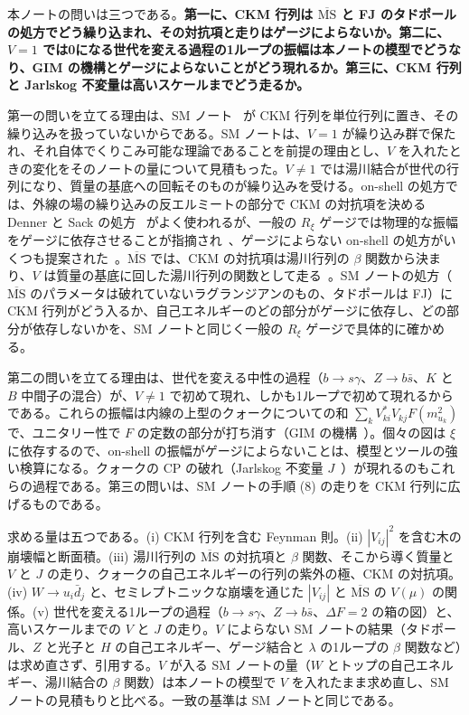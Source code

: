 \documentclass[a4paper,10pt]{ltjsarticle}
\newcommand{\MSbar}{\overline{\mathrm{MS}}}
\begin{document}
本ノートの問いは三つである。\textbf{第一に、CKM 行列は $\MSbar$ と FJ のタドポールの処方でどう繰り込まれ、その対抗項と走りはゲージによらないか。第二に、$V=1$ では0になる世代を変える過程の1ループの振幅は本ノートの模型でどうなり、GIM の機構とゲージによらないことがどう現れるか。第三に、CKM 行列と Jarlskog 不変量は高いスケールまでどう走るか。}

第一の問いを立てる理由は、SM ノート~\cite{smnote} が CKM 行列を単位行列に置き、その繰り込みを扱っていないからである。SM ノートは、$V=1$ が繰り込み群で保たれ、それ自体でくりこみ可能な理論であることを前提の理由とし、$V$ を入れたときの変化をそのノートの量について見積もった。$V\ne1$ では湯川結合が世代の行列になり、質量の基底への回転そのものが繰り込みを受ける。on-shell の処方では、外線の場の繰り込みの反エルミートの部分で CKM の対抗項を決める Denner と Sack の処方~\cite{ds90} がよく使われるが、一般の $R_\xi$ ゲージでは物理的な振幅をゲージに依存させることが指摘され~\cite{ggm99,yamada01}、ゲージによらない on-shell の処方がいくつも提案された~\cite{dkr04,ks06}。$\MSbar$ では、CKM の対抗項は湯川行列の $\beta$ 関数から決まり、$V$ は質量の基底に回した湯川行列の関数として走る~\cite{babu87,bhmp99}。SM ノートの処方（$\MSbar$ のパラメータは破れていないラグランジアンのもの、タドポールは FJ）に CKM 行列がどう入るか、自己エネルギーのどの部分がゲージに依存し、どの部分が依存しないかを、SM ノートと同じく一般の $R_\xi$ ゲージで具体的に確かめる。

第二の問いを立てる理由は、世代を変える中性の過程（$b\to s\gamma$、$Z\to b\bar s$、$K$ と $B$ 中間子の混合）が、$V\ne1$ で初めて現れ、しかも1ループで初めて現れるからである。これらの振幅は内線の上型のクォークについての和 $\sum_kV_{ki}^*V_{kj}F(m_{u_k}^2)$ で、ユニタリー性で $F$ の定数の部分が打ち消す（GIM の機構~\cite{gim70}）。個々の図は $\xi$ に依存するので、on-shell の振幅がゲージによらないことは、模型とツールの強い検算になる。クォークの CP の破れ（Jarlskog 不変量 $J$~\cite{jarlskog85}）が現れるのもこれらの過程である。第三の問いは、SM ノートの手順 (8) の走りを CKM 行列に広げるものである。

求める量は五つである。(i) CKM 行列を含む Feynman 則。(ii) $|V_{ij}|^2$ を含む木の崩壊幅と断面積。(iii) 湯川行列の $\MSbar$ の対抗項と $\beta$ 関数、そこから導く質量と $V$ と $J$ の走り、クォークの自己エネルギーの行列の紫外の極、CKM の対抗項。(iv) $W\to u_i\bar d_j$ と、セミレプトニックな崩壊を通じた $|V_{ij}|$ と $\MSbar$ の $V(\mu)$ の関係。(v) 世代を変える1ループの過程（$b\to s\gamma$、$Z\to b\bar s$、$\Delta F=2$ の箱の図）と、高いスケールまでの $V$ と $J$ の走り。$V$ によらない SM ノートの結果（タドポール、$Z$ と光子と $H$ の自己エネルギー、ゲージ結合と $\lambda$ の1ループの $\beta$ 関数など）は求め直さず、引用する。$V$ が入る SM ノートの量（$W$ とトップの自己エネルギー、湯川結合の $\beta$ 関数）は本ノートの模型で $V$ を入れたまま求め直し、SM ノートの見積もりと比べる。一致の基準は SM ノートと同じである。
\end{document}
